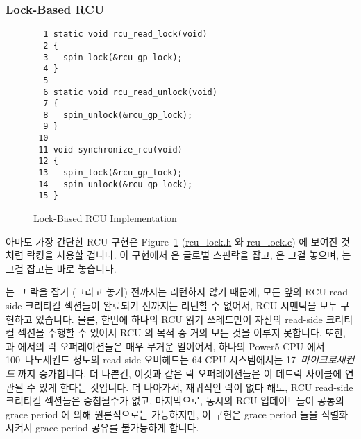 \subsubsection{Lock-Based RCU}
\label{defer:Lock-Based RCU}

\begin{figure}[bp]
{ \scriptsize
\begin{verbatim}
  1 static void rcu_read_lock(void)
  2 {
  3   spin_lock(&rcu_gp_lock);
  4 }
  5
  6 static void rcu_read_unlock(void)
  7 {
  8   spin_unlock(&rcu_gp_lock);
  9 }
 10
 11 void synchronize_rcu(void)
 12 {
 13   spin_lock(&rcu_gp_lock);
 14   spin_unlock(&rcu_gp_lock);
 15 }
\end{verbatim}
}
\caption{Lock-Based RCU Implementation}
\label{fig:defer:Lock-Based RCU Implementation}
\end{figure}

아마도 가장 간단한 RCU 구현은
Figure~\ref{fig:defer:Lock-Based RCU Implementation}
(\url{rcu_lock.h} 와 \url{rcu_lock.c}) 에 보여진 것처럼 락킹을 사용할 겁니다.
이 구현에서  은 글로벌 스핀락을 잡고,
 은 그걸 놓으며,  는 그걸 잡고는
바로 놓습니다.
\iffalse

Perhaps the simplest RCU implementation leverages locking, as
shown in
Figure~\ref{fig:defer:Lock-Based RCU Implementation}
(\url{rcu_lock.h} and \url{rcu_lock.c}).
In this implementation, \co{rcu_read_lock()} acquires a global
spinlock, \co{rcu_read_unlock()} releases it, and
\co{synchronize_rcu()} acquires it then immediately releases it.
\fi

 는 그 락을 잡기 (그리고 놓기) 전까지는 리턴하지 않기
때문에, 모든 앞의 RCU read-side 크리티컬 섹션들이 완료되기 전까지는 리턴할 수
없어서, RCU 시맨틱을 모두 구현하고 있습니다.
물론, 한번에 하나의 RCU 읽기 쓰레드만이 자신의 read-side 크리티컬 섹션을 수행할
수 있어서 RCU 의 목적 중 거의 모든 것을 이루지 못합니다.
또한,  과  에서의 락 오퍼레이션들은
매우 무거운 일이어서, 하나의 Power5 CPU 에서 100~나노세컨드 정도의 read-side
오버헤드는 64-CPU 시스템에서는 17~\emph{마이크로세컨드} 까지 증가합니다.
더 나쁜건, 이것과 같은 락 오퍼레이션들은  이 데드락
사이클에 연관될 수 있게 한다는 것입니다.
더 나아가서, 재귀적인 락이 없다 해도, RCU read-side 크리티컬 섹션들은
중첩될수가 없고, 마지막으로, 동시의 RCU 업데이트들이 공통의 grace period 에
의해 원론적으로는 가능하지만, 이 구현은 grace period 들을 직렬화 시켜서
grace-period 공유를 불가능하게 합니다.
\iffalse

